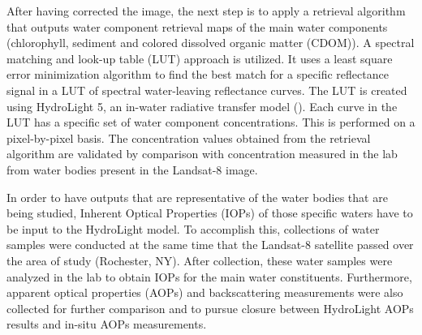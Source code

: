 After having corrected the image, the next step is to apply a retrieval algorithm that outputs water component retrieval maps of the main water components (chlorophyll, { sediment} and colored dissolved organic matter (CDOM)). A spectral matching and look-up table (LUT) approach is utilized. It uses a least square error minimization algorithm to find the best match for a specific reflectance signal in a LUT of spectral water-leaving reflectance curves. The LUT is created using HydroLight 5, an in-water radiative transfer model (\cite{Mobley:2005}). Each curve in the LUT has a specific set of water component concentrations. This is performed on a pixel-by-pixel basis. The concentration values obtained from the retrieval algorithm are validated by comparison with concentration measured in the lab from water bodies present in the Landsat-8 image.

In order to have outputs that are representative of the water bodies that are being studied, Inherent Optical Properties (IOPs) of those specific waters have to be input to the HydroLight model. To accomplish this, collections of water samples were conducted at the same time that the Landsat-8 satellite passed over the area of study (Rochester, NY). After collection, these water samples were analyzed in the lab to obtain IOPs for the main water constituents. Furthermore, apparent optical properties (AOPs) and backscattering measurements were also collected for further comparison and to pursue closure between HydroLight AOPs results and in-situ AOPs measurements.